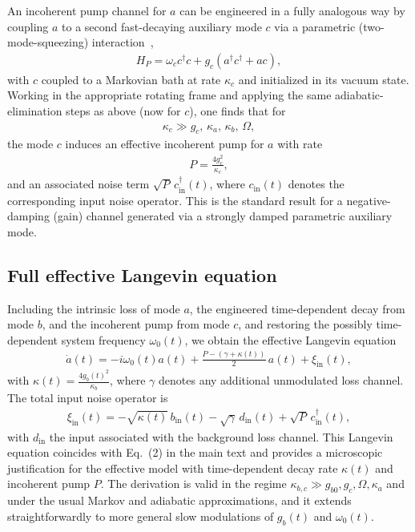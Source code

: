 \documentclass[prl,onecolumn,floatfix,10pt,superscriptaddress]{revtex4-2}
\begin{document}
An incoherent pump channel for $a$ can be engineered in a fully analogous way by coupling $a$ to a second fast-decaying auxiliary mode $c$ via a parametric (two-mode-squeezing) interaction~\cite{Roushan2017,Busnaina2024},
\begin{align}
H_P = \omega_c c^\dagger c + g_c (a^\dagger c^\dagger + a c),
\end{align}
with $c$ coupled to a Markovian bath at rate $\kappa_c$ and initialized in its vacuum state. Working in the appropriate rotating frame and applying the same adiabatic-elimination steps as above (now for $c$), one finds that for
\begin{align}
\kappa_c \gg g_c,\, \kappa_a,\, \kappa_b,\, \Omega,
\end{align}
the mode $c$ induces an effective incoherent pump for $a$ with rate
\begin{align}
P = \frac{4 g_c^2}{\kappa_c},
\end{align}
and an associated noise term $\sqrt{P}\, c_{\text{in}}^\dagger(t)$, where $c_{\text{in}}(t)$ denotes the corresponding input noise operator. This is the standard result for a negative-damping (gain) channel generated via a strongly damped parametric auxiliary mode.

\subsection{Full effective Langevin equation}

Including the intrinsic loss of mode $a$, the engineered time-dependent decay from mode $b$, and the incoherent pump from mode $c$, and restoring the possibly time-dependent system frequency $\omega_0(t)$, we obtain the effective Langevin equation
\begin{align}
\dot{a}(t)
= -i \omega_0(t) a(t)
+ \frac{P - (\gamma + \kappa(t))}{2}\, a(t)
+ \xi_\mathrm{in}(t),
\end{align}
with $\kappa(t) = \frac{4 g_b(t)^2}{\kappa_b}$, where $\gamma$ denotes any additional unmodulated loss channel. The total input noise operator is
\begin{align}
\xi_\mathrm{in}(t)
= -\sqrt{\kappa(t)}\, b_{\text{in}}(t)
  -\sqrt{\gamma}\, d_{\text{in}}(t)
  +\sqrt{P}\, c_{\text{in}}^\dagger(t),
\end{align}
with $d_{\text{in}}$ the input associated with the background loss channel. This Langevin equation coincides with Eq.~(2) in the main text and provides a microscopic justification for the effective model with time-dependent decay rate $\kappa(t)$ and incoherent pump $P$. The derivation is valid in the regime $\kappa_{b,c} \gg g_{b0}, g_c, \Omega, \kappa_a$ and under the usual Markov and adiabatic approximations, and it extends straightforwardly to more general slow modulations of $g_b(t)$ and $\omega_0(t)$. 
\end{document}
